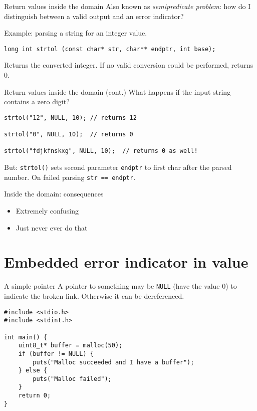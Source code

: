 \documentclass[aspectratio=169,14pt]{beamer}
\begin{document}
\begin{frame}[fragile]{Return values inside the domain}
Also known as \textit{semipredicate problem}: how do I distinguish between a valid output and an error indicator?

Example: parsing a string for an integer value.

\begin{lstlisting}[style=cstyle]
long int strtol (const char* str, char** endptr, int base);
\end{lstlisting}

Returns the converted integer. If no valid conversion could be performed, returns 0.
\end{frame}



\begin{frame}[fragile]{Return values inside the domain (cont.)}
What happens if the input string contains a zero digit?

\begin{lstlisting}[style=cstyle]
strtol("12", NULL, 10); // returns 12

strtol("0", NULL, 10);  // returns 0

strtol("fdjkfnskxg", NULL, 10);  // returns 0 as well!
\end{lstlisting}

But: \texttt{strtol()} sets second parameter \texttt{endptr} to first char after the parsed number. On failed parsing \texttt{str == endptr}.
\end{frame}




\begin{frame}[fragile]{Inside the domain: consequences}
\begin{itemize}
    \item[\bad] Extremely confusing
    \item[\bad] Just never ever do that
\end{itemize}
\end{frame}




\section{Embedded error indicator in value}

\begin{frame}[fragile]{A simple pointer}
A pointer to something may be \texttt{NULL} (have the value 0) to indicate the broken link. Otherwise it can be dereferenced.

\begin{lstlisting}[style=cstyle]
#include <stdio.h>
#include <stdint.h>

int main() {
    uint8_t* buffer = malloc(50);
    if (buffer != NULL) {
        puts("Malloc succeeded and I have a buffer");
    } else {
        puts("Malloc failed");
    }
    return 0;
}
\end{lstlisting}
\end{frame}
\end{document}
